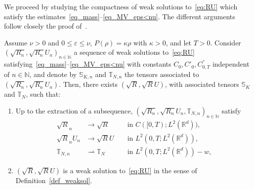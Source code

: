 \documentclass[AHL,Unicode,longabstracts]{cedram}
\newcommand*\<{\left\langle}
\renewcommand*\>{\right\rangle}
\renewcommand*\le{\leqslant}
\begin{document}
We proceed by studying the compactness of weak solutions to~\eqref{eq:RU} which satisfy the estimates~\eqref{eq_mass}--\eqref{eq_MV_eps<nu}. The different arguments follow closely the proof of~\cite[Theorem~2.1]{MelletVasseur}.

\begin{theo}\label{theo:compacite}
Assume $\nu >0$ and $0 \le \varepsilon \le \nu$, $P(\rho)=\kappa \rho$ with $\kappa >0$, and let $T>0$. Consider $(\sqrt{R_n}, \sqrt{R_n} U_n)_{n\in \mathbb N}$ a sequence of weak solutions to~\eqref{eq:RU} satisfying~\eqref{eq_mass}--\eqref{eq_MV_eps<nu} with constants $C_0,C'_0,C^{''}_{0,T}$ independent of $n \in \mathbb N$, and denote by $\mathbb S_{K,n}$ and $\mathbb T_{N,n}$ the tensors associated to $(\sqrt{R_n}, \sqrt{R_n} U_n)$. Then, there exists $(\sqrt{R},\sqrt{R}U)$, with associated tensors $\mathbb S_K$ and $\mathbb T_N$, such that:
\begin{enumerate}
\item \label{4.10.1} Up to the extraction of a subsequence, $(\sqrt{R_n},\sqrt{R_n} U_n,\mathbb T_{N,n})_{n\in \mathbb N}$ satisfy
\[
\begin{aligned}
\sqrt{R}_n &\to \sqrt{R} && \text{ in } C([0,T) ; L^2(\mathbb R^d)), \\
\sqrt{R}_n U_n &\to \sqrt{R}U &&\text{ in $L^2(0,T;L^2(\mathbb R^d)),$} \\
\mathbb T_{N,n} &\rightharpoonup \mathbb T_N && \text{ in $L^2(0,T;L^2(\mathbb R^d))-w$},
\end{aligned}
\]
\item \label{4.10.2} $(\sqrt{R},\sqrt{R} U)$ is a weak solution to~\eqref{eq:RU} in the sense of Definition~\ref{def_weaksol}.
\end{enumerate}
\end{theo}
\end{document}

